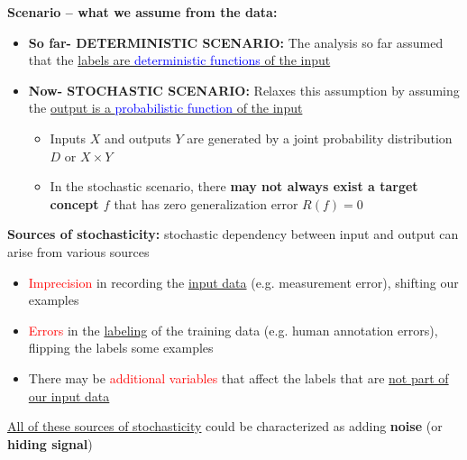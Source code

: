 \documentclass[12pt, a4paper]{article}
\begin{document}
\textbf{Scenario – what we assume from the data:}
\begin{itemize}
  \item \textbf{So far- DETERMINISTIC SCENARIO:} The analysis so far assumed that the \uline{labels are \textcolor{blue}{deterministic functions} of the input}
  \item \textbf{Now- STOCHASTIC SCENARIO:} Relaxes this assumption by assuming the \uline{output is a \textcolor{blue}{probabilistic function} of the input}
  \begin{itemize}
    \item Inputs $X$ and outputs $Y$ are generated by a joint probability distribution $D$ or $X \times Y$
    \item In the stochastic scenario, there \textbf{may not always exist a target concept $f$} that has zero generalization error $R(f) = 0$
  \end{itemize}
\end{itemize}


\textbf{Sources of stochasticity:} stochastic dependency between input and output can arise from various sources
\begin{itemize}
  \item \textcolor{red}{Imprecision} in recording the \uline{input data} (e.g. measurement error), shifting our examples
  \item \textcolor{red}{Errors} in the \uline{labeling} of the training data (e.g. human annotation errors), flipping the labels some examples
  \item There may be \textcolor{red}{additional variables} that affect the labels that are \uline{not part of our input data}
\end{itemize}
\uline{All of these sources of stochasticity} could be characterized as adding \textbf{noise} (or \textbf{hiding signal})
\end{document}

